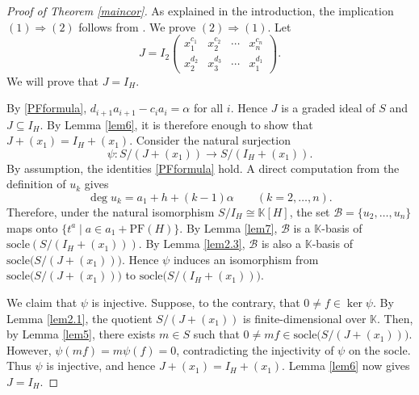 \documentclass[12pt]{amsart}
\numberwithin{equation}{section}
\theoremstyle{definition}
\newcommand{\PF}{\mathrm{PF}}
\newcommand{\socle}{\mathrm{socle}}
\newcommand{\F}{\mathbb{K}}
\begin{document}
\begin{proof}[Proof of Theorem \ref{maincor}]
As explained in the introduction, the implication
$(1)\Rightarrow(2)$ follows from \cite[Theorem 3]{KM}.
We prove $(2)\Rightarrow(1)$.
Let
\[
J=
I_2
\begin{pmatrix}
x_1^{c_1} & x_2^{c_2} & \cdots & x_n^{c_n}\\
x_2^{d_2} & x_3^{d_3} & \cdots & x_1^{d_1}
\end{pmatrix}.
\]
We will prove that $J=I_H$.

By \eqref{PFformula},
$
d_{i+1}a_{i+1}-c_i a_i=\alpha
$
for all $i$.
Hence $J$ is a graded ideal of $S$ and $J\subseteq I_H$.
By Lemma \ref{lem6}, it is therefore enough to show that
$
J+(x_1)=I_H+(x_1).
$
Consider the natural surjection
\[\psi : S/(J+(x_1)) \longrightarrow S/(I_H+(x_1)).\]
By assumption, the identities \eqref{PFformula} hold.
A direct computation from the definition of $u_k$ gives
\[
\deg u_k=a_1+h+(k-1)\alpha
\qquad (k=2,\dots,n).
\]
Therefore, under the natural isomorphism
$S/I_H\cong\F[H]$,
the set
$\mathcal B=\{u_2,\dots,u_n\}$
maps onto
$\{t^a\mid a\in a_1+\PF(H)\}$.
By Lemma \ref{lem7},  $\mathcal B$ is a $\F$-basis of
$
\socle(S/(I_H+(x_1))).
$
%
By Lemma \ref{lem2.3}, $\mathcal B$ is also a $\F$-basis of
$
\socle\big(S/(J+(x_1))\big).
$
Hence $\psi$ induces an isomorphism
from
$\socle\big(S/(J+(x_1))\big)$
to
$\socle\big(S/(I_H+(x_1))\big)$.

We claim that $\psi$ is injective.
Suppose, to the contrary, that
$0\neq f\in\ker\psi$.
By Lemma \ref{lem2.1}, the quotient $S/(J+(x_1))$ is
finite-dimensional over $\F$.
Then, by Lemma \ref{lem5}, there exists $m\in S$ such that
$0\neq mf\in\socle\big(S/(J+(x_1))\big)$.
However,
$\psi(mf)=m\psi(f)=0$,
contradicting the injectivity of $\psi$ on the socle.
Thus $\psi$ is injective, and hence
$J+(x_1)=I_H+(x_1)$.
Lemma \ref{lem6} now gives $J=I_H$.
\end{proof}
\end{document}
